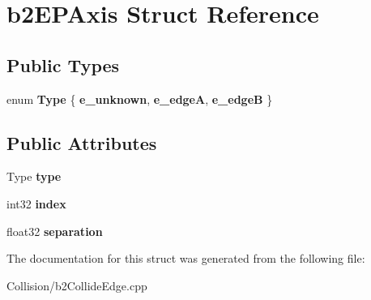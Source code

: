 \hypertarget{structb2EPAxis}{}\section{b2\+E\+P\+Axis Struct Reference}
\label{structb2EPAxis}
\subsection*{Public Types}
\begin{DoxyCompactItemize}
\item 
\mbox{\label{structb2EPAxis_a1a2feab0d321a5cd20677c92cbfd6f3c}} 
enum {\bfseries Type} \{ {\bfseries e\+\_\+unknown}, 
{\bfseries e\+\_\+edgeA}, 
{\bfseries e\+\_\+edgeB}
 \}
\end{DoxyCompactItemize}
\subsection*{Public Attributes}
\begin{DoxyCompactItemize}
\item 
\mbox{\label{structb2EPAxis_a336d3ba4b4ed020a1f6c4c0f70098e39}} 
Type {\bfseries type}
\item 
\mbox{\label{structb2EPAxis_a8e530d411d98e7ab8112c4022f5f65e4}} 
int32 {\bfseries index}
\item 
\mbox{\label{structb2EPAxis_acfd60cfd1f1ad4c448bd0260117ef6fc}} 
float32 {\bfseries separation}
\end{DoxyCompactItemize}


The documentation for this struct was generated from the following file\+:\begin{DoxyCompactItemize}
\item 
Collision/b2\+Collide\+Edge.\+cpp\end{DoxyCompactItemize}
